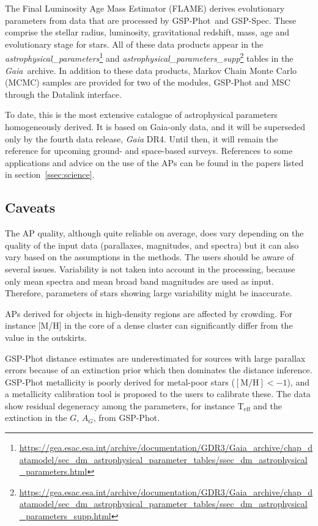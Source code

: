 \documentclass[longauth]{aa}
\makeatletter
\providecommand{\teff}{\ensuremath{{\mathrm{T_{eff}}}}\xspace}
\providecommand{\ag}{\ensuremath{A_G}\xspace}
\providecommand\gmag{\ensuremath{G}\xspace}
\providecommand{\modulename}[1]{#1\xspace}
\providecommand{\gspphot}{\modulename{GSP-Phot}}
\providecommand{\gspspec}{\modulename{GSP-Spec}}
\newcommand\gaia{\textit{Gaia}\xspace}
\providecommand{\linktodoc}{https://gea.esac.esa.int/archive/documentation/GDR3}
\providecommand{\linktotableap}[1]{\url{\linktodoc/Gaia_archive/chap_datamodel/sec_dm_astrophysical_parameter_tables/ssec_dm_#1.html}} %
\DeclareRobustCommand*{\fieldName}[1]{%
  \begingroup\@fieldName\scantokens{\texttt{\small {#1}}\noexpand}\endgroup}
\makeatother
\begin{document}
The Final   Luminosity   Age   Mass   Estimator (FLAME)  derives evolutionary parameters from data that are processed by \gspphot\ and \gspspec.  These comprise the stellar radius, luminosity, gravitational redshift,  mass,  age and evolutionary stage for stars. All of these data products appear in the \textit{astrophysical\_parameters}\footnote{\linktotableap{astrophysical_parameters}} 
and \textit{astrophysical\_parameters\_supp}\footnote{\linktotableap{astrophysical_parameters_supp}} tables in the \gaia\ archive.
In addition to these data products, Markov Chain Monte Carlo  (MCMC) samples are provided for two of the modules, \gspphot  and MSC through the Datalink interface.

To date, this is the most extensive catalogue of astrophysical parameters homogeneously derived. It is based on Gaia-only data, and it will be superseded only by the fourth data release, {\it Gaia} DR4. Until then, it will remain the reference for upcoming ground- and space-based surveys. References to some applications and advice on the use of the APs can be found in the papers listed in section~\ref{ssec:science}.

\subsection{Caveats}
The AP quality, although quite reliable on average, does vary  depending on the quality of the input data (parallaxes, magnitudes, and spectra) but it can also vary based on the assumptions in the methods.  The users should be aware of several issues.
 Variability is not taken into account in the processing, because only mean spectra and mean broad band magnitudes are used as input. Therefore, parameters of stars showing  large variability might be inaccurate.

 APs derived for objects in high-density regions are affected by crowding. For instance [M/H] in the core of a dense cluster can significantly differ from the value in the outskirts.
 
 \gspphot distance estimates are
    underestimated for sources with large parallax errors because of an extinction prior which then dominates the distance inference.
\gspphot metallicity is poorly derived for metal-poor stars ($[\mathrm{M}/\mathrm{H}]<-1$), and a metallicity calibration tool is proposed to the users to calibrate these. The data show residual degeneracy among the parameters, for instance \teff and the extinction in the \gmag, \ag, from \gspphot.
\end{document}
